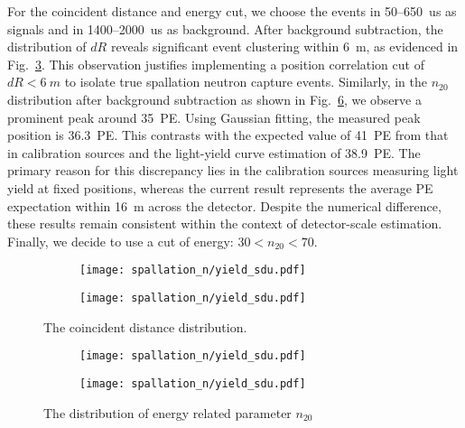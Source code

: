 For the coincident distance and energy cut, we choose the events in 50--\SI{650}{us} as signals and in 1400--\SI{2000}{us} as background.
After background subtraction, the distribution of $dR$ reveals significant event clustering within \SI{6}{m}, as evidenced in Fig.~\ref{fig:coinDisSPN}. This observation justifies implementing a position correlation cut of $dR<\SI{6}{m}$ to isolate true spallation neutron capture events. Similarly, in the $n_{20}$ distribution after background subtraction as shown in Fig.~\ref{fig:coinESPN}, we observe a prominent peak around \SI{35}{PE}. Using Gaussian fitting, the measured peak position is \SI{36.3}{PE}. This contrasts with the expected value of \SI{41}{PE} from that in calibration sources and the light-yield curve estimation of \SI{38.9}{PE}. The primary reason for this discrepancy lies in the calibration sources measuring light yield at fixed positions, whereas the current result represents the average PE expectation within \SI{16}{m} across the detector. Despite the numerical difference, these results remain consistent within the context of detector-scale estimation. Finally, we decide to use a cut of energy: $30<n_{20}<70$.
\begin{figure}[htbp]
	\centering
	\begin{subfigure}{0.5\textwidth}
		\centering
		\texttt{[image: spallation\_n/yield\_sdu.pdf]}
		\caption{}
		\label{fig:coinDisSPN0}
	\end{subfigure}%
	\begin{subfigure}{0.5\textwidth}
		\centering
		\texttt{[image: spallation\_n/yield\_sdu.pdf]}
		\caption{}
		\label{fig:coinDisSPN1}
	\end{subfigure}
	\caption{The coincident distance distribution.}
	\label{fig:coinDisSPN}
\end{figure}

\begin{figure}[htbp]
	\centering
	\begin{subfigure}{0.5\textwidth}
		\centering
		\texttt{[image: spallation\_n/yield\_sdu.pdf]}
		\caption{}
		\label{fig:coinESPN0}
	\end{subfigure}%
	\begin{subfigure}{0.5\textwidth}
		\centering
		\texttt{[image: spallation\_n/yield\_sdu.pdf]}
		\caption{}
		\label{fig:coinESPN1}
	\end{subfigure}
	\caption{The distribution of energy related parameter $n_{20}$}
	\label{fig:coinESPN}
\end{figure}

